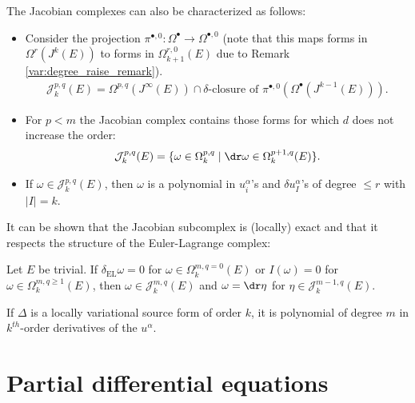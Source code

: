     \begin{property}
        The Jacobian complexes can also be characterized as follows:
        \begin{itemize}
            \item Consider the projection $\pi^{\bullet,0}:\Omega^\bullet\rightarrow\Omega^{\bullet,0}$ (note that this maps forms in $\Omega^r(J^k(E))$ to forms in $\Omega^{r,0}_{k+1}(E)$ due to Remark \ref{var:degree_raise_remark}).
            \begin{gather}
                \mathcal{J}^{p,q}_k(E) = \Omega^{p,q}(J^\infty(E))\cap\delta\text{-closure of }\pi^{\bullet,0}\left(\Omega^\bullet(J^{k-1}(E))\right).
            \end{gather}
            \item For $p<m$ the Jacobian complex contains those forms for which $d$ does not increase the order:
            \begin{gather}
                \mathcal{J}^{p,q}_k(E) = \{\omega\in\Omega^{p,q}_k\mid\dr\omega\in\Omega^{p+1,q}_k(E)\}.
            \end{gather}
            \item If $\omega\in\mathcal{J}^{p,q}_k(E)$, then $\omega$ is a polynomial in $u^\alpha_i$'s and $\delta u^\alpha_I$'s of degree $\leq r$ with $|I|=k$.
        \end{itemize}
    \end{property}

    It can be shown that the Jacobian subcomplex is (locally) exact and that it respects the structure of the Euler-Lagrange complex:
    \begin{property}[Exactness]
        Let $E$ be trivial. If $\delta_\mathrm{EL}\omega=0$ for $\omega\in\Omega^{m,q=0}_k(E)$ or $I(\omega)=0$ for $\omega\in\Omega^{m,q\geq1}_k(E)$, then $\omega\in\mathcal{J}^{m,q}_k(E)$ and $\omega=\dr\eta$ for $\eta\in\mathcal{J}^{m-1,q}_k(E)$.
    \end{property}

    \begin{property}
        If $\Delta$ is a locally variational source form of order $k$, it is polynomial of degree $m$ in $k^{th}$-order derivatives of the $u^\alpha$.
    \end{property}

\section{Partial differential equations}

